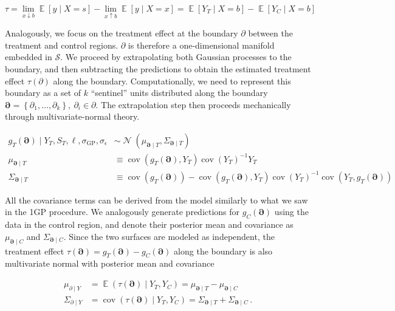 \documentclass[letter]{article}
\newcommand{\genericdel}[3]{%
      \left#1#3\right#2
    }
\newcommand{\del}[1]{\genericdel(){#1}}
\newcommand{\sbr}[1]{\genericdel[]{#1}}
\newcommand{\cbr}[1]{\genericdel\{\}{#1}}
\DeclareMathOperator{\E}{\mathbb{E}}
\DeclareMathOperator{\cov}{{cov}}
\DeclareMathOperator{\normal}{\mathcal{N}}
\newcommand{\scrS}{\mathscr{S}}
\newcommand{\sigmaf}{\sigma_{\mathrm{GP}}}
\newcommand{\sigman}{\sigma_{\epsilon}}
\newcommand{\boundary}{\partial}
\newcommand{\sentinels}{\bm{\boundary}}
\begin{document}
\begin{equation}
\tau = \lim_{x \downarrow b} \E\sbr{y \mid X=s} - \lim_{x \uparrow b} \E\sbr{y \mid X=x} = \E\sbr{Y_T \mid X=b} - \E\sbr{Y_C \mid X=b}
\end{equation}

Analogously, we focus on the treatment effect at the boundary
\(\boundary\) between the treatment and control regions. \(\boundary\)
is therefore a one-dimensional manifold embedded in \(\scrS\). We
proceed by extrapolating both Gaussian processes to the boundary, and
then subtracting the predictions to obtain the estimated treatment
effect \(\tau(\boundary)\) along the boundary. Computationally, we need
to represent this boundary as a set of \(k\) ``sentinel'' units
distributed along the boundary
\(\sentinels=\cbr{\boundary_1,\ldots,\boundary_k},~\partial_i \in \partial\).
The extrapolation step then proceeds mechanically through
multivariate-normal theory.

\begin{equation}\begin{split}
    g_T(\sentinels) \mid Y_T, S_T, \ell, \sigmaf, \sigman &\sim \normal\del{\mu_{\sentinels \mid T}, \Sigma_{\sentinels \mid T}} \\
    \mu_{\sentinels \mid T} &\equiv \cov\del{g_T(\sentinels), Y_T} \cov\del{Y_T}^{-1}  Y_T \\
    \Sigma_{\sentinels \mid T} &\equiv \cov \del{g_T(\sentinels)} - \cov\del{g_T(\sentinels), Y_T} \cov\del{Y_T}^{-1} \cov\del{Y_T,g_T(\sentinels) \label{eq:postvarT2gp}
    }
\end{split}\end{equation}

All the covariance terms can be derived from the model similarly to what
we saw in the 1GP procedure. We analogously generate predictions for
\(g_C(\sentinels)\) using the data in the control region, and denote
their posterior mean and covariance as \(\mu_{\sentinels \mid C}\) and
\(\Sigma_{\sentinels \mid C}\). Since the two surfaces are modeled as
independent, the treatment effect
\(\tau(\sentinels)=g_T(\sentinels)-g_C(\sentinels)\) along the boundary
is also multivariate normal with posterior mean and covariance

\begin{equation}
\label{eq:postvar2gp}
\begin{split}
    \mu_{\boundary \mid Y} &= \E \del{\tau(\sentinels) \mid Y_T, Y_C} = \mu_{\sentinels \mid T} - \mu_{\sentinels \mid C} \\
    \Sigma_{\boundary \mid Y} &= \cov\del{\tau(\sentinels) \mid Y_T, Y_C} = \Sigma_{\sentinels \mid T} + \Sigma_{\sentinels \mid C}\,.
\end{split}\end{equation}
    
\end{document}
